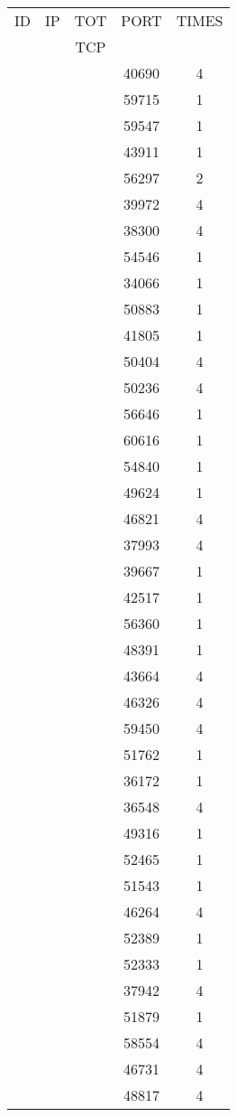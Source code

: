 \documentclass[a4paper]{scrartcl}
\begin{document}
\begin{minipage}[b]{0.5\linewidth}
\begin{tabular}{| c | c | c | c | c |}
\hline
ID & IP & TOT & PORT & TIMES \\ 
   &    & TCP &      &       \\ 
\hline
& & & 40690 & 4 \\ & & & 59715 & 1 \\ & & & 59547 & 1 \\ & & & 43911 & 1 \\ & & & 56297 & 2 \\ & & & 39972 & 4 \\ & & & 38300 & 4 \\ & & & 54546 & 1 \\ & & & 34066 & 1 \\ & & & 50883 & 1 \\ & & & 41805 & 1 \\ & & & 50404 & 4 \\ & & & 50236 & 4 \\ & & & 56646 & 1 \\ & & & 60616 & 1 \\ & & & 54840 & 1 \\ & & & 49624 & 1 \\ & & & 46821 & 4 \\ & & & 37993 & 4 \\ & & & 39667 & 1 \\ & & & 42517 & 1 \\ & & & 56360 & 1 \\ & & & 48391 & 1 \\ & & & 43664 & 4 \\ & & & 46326 & 4 \\ & & & 59450 & 4 \\ & & & 51762 & 1 \\ & & & 36172 & 1 \\ & & & 36548 & 4 \\ & & & 49316 & 1 \\ & & & 52465 & 1 \\ & & & 51543 & 1 \\ & & & 46264 & 4 \\ & & & 52389 & 1 \\ & & & 52333 & 1 \\ & & & 37942 & 4 \\ & & & 51879 & 1 \\ & & & 58554 & 4 \\ & & & 46731 & 4 \\ & & & 48817 & 4 \\ \hline\end{tabular}\end{minipage} \hfill\begin{minipage}[b]{0.5\linewidth}\begin{tabular}{| c | c | c | c | c |}

\end{tabular}
\end{minipage}
\end{document}
